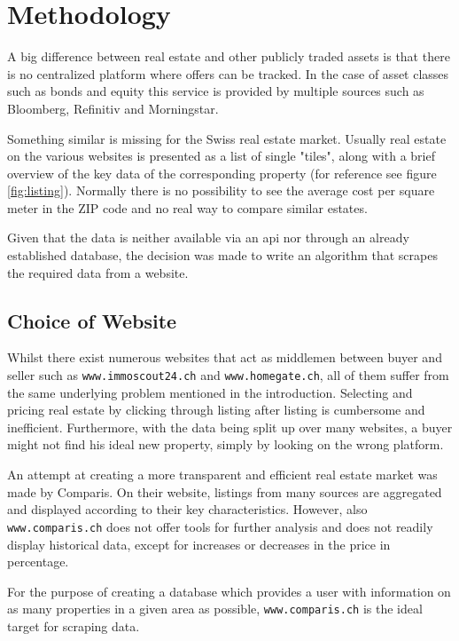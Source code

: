 \documentclass[main]{subfiles}
\begin{document}
\section{Methodology}
A big difference between real estate and other publicly traded assets is that there is no centralized platform where offers can be tracked. 
In the case of asset classes such as bonds and equity this service is provided by multiple sources such as Bloomberg, Refinitiv and Morningstar.

Something similar is missing for the Swiss real estate market. 
Usually real estate on the various websites is presented as a list of single "tiles", 
along with a brief overview of the key data of the corresponding property (for reference see figure \ref{fig:listing}).
Normally there is no possibility to see the average cost per square meter in the ZIP code 
and no real way to compare similar estates.

Given that the data is neither available via an \acs*{api} nor through an already established database,
the decision was made to write an algorithm that scrapes the required data from a website.


\subsection{Choice of Website}

Whilst there exist numerous websites that act as middlemen between buyer and seller such as \verb|www.immoscout24.ch| and \verb|www.homegate.ch|,
all of them suffer from the same underlying problem mentioned in the introduction. 
Selecting and pricing real estate by clicking through listing after listing is cumbersome and inefficient.
Furthermore, with the data being split up over many websites, a buyer might not find his ideal new property, simply by looking on the wrong platform.

An attempt at creating a more transparent and efficient real estate market was made by Comparis. 
On their website, listings from many sources are aggregated and displayed according to their key characteristics.
However, also \verb|www.comparis.ch| does not offer tools for further analysis and does not readily display historical data,
except for increases or decreases in the price in percentage.

For the purpose of creating a database which provides a user with information on as many properties in a given area as possible, 
\verb|www.comparis.ch| is the ideal target for scraping data.
\end{document}
